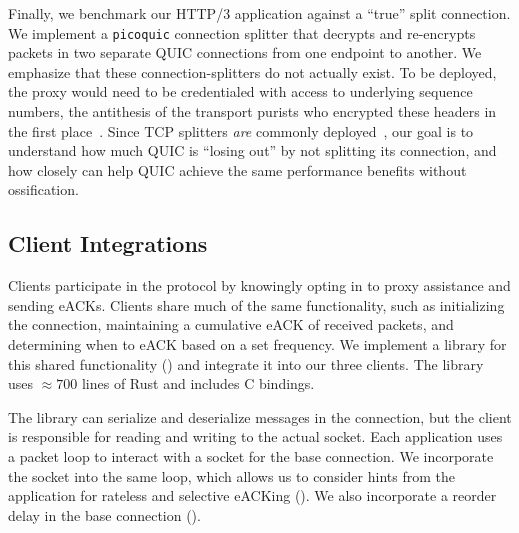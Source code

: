 Finally, we benchmark our HTTP/3 application against a ``true'' split
connection. We implement a \texttt{picoquic} connection splitter that decrypts
and re-encrypts packets in two separate QUIC connections from one endpoint to
another. We emphasize that these connection-splitters do not actually exist. To
be deployed, the proxy would need to be credentialed with access to underlying
sequence numbers, the antithesis of the transport purists who encrypted these
headers in the first place~\cite{duke2023rfc}. Since TCP splitters \textit
{are} commonly deployed~\cite{honda2011still,rfc3135}, our goal is to
understand how much QUIC is ``losing out'' by not splitting its connection, and
how closely \Sys can help QUIC achieve the same performance benefits without
ossification.

\subsection{Client Integrations}



Clients participate in the \Sys protocol by knowingly opting in to proxy
assistance and sending eACKs. Clients share much of the same functionality,
such as initializing the \Sys connection, maintaining a cumulative eACK of
received packets, and determining when to eACK based on a set frequency. We
implement a library for this shared functionality ()
and integrate it into our three clients.
The library uses $\approx\!700$ lines of Rust and includes C bindings.

The library can serialize and deserialize messages in the \Sys connection, but
the client is responsible for reading and writing to the actual socket. Each
application uses a packet loop to interact with a socket for the base
connection. We incorporate the \Sys socket into the same loop, which allows us to
consider hints from the application for rateless and selective eACKing
(). We also incorporate a reorder delay in the base
connection ().




